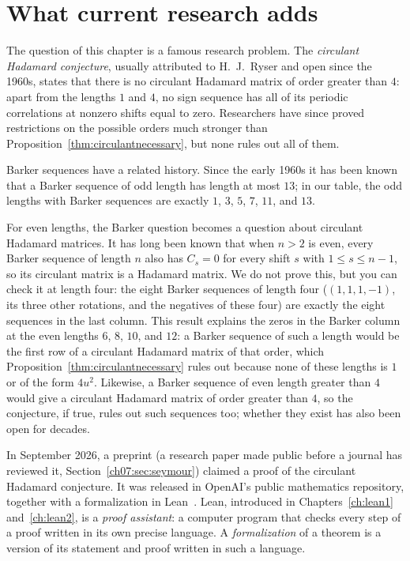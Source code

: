 \section{What current research adds}\label{ch14:sec:research}
The question of this chapter is a famous research problem. The \emph{circulant Hadamard conjecture}, usually attributed to H.~J.~Ryser and open since the 1960s, states that there is no circulant Hadamard matrix of order greater than $4$: apart from the lengths $1$ and $4$, no sign sequence has all of its periodic correlations at nonzero shifts equal to zero. Researchers have since proved restrictions on the possible orders much stronger than Proposition~\ref{thm:circulantnecessary}, but none rules out all of them.

Barker sequences have a related history. Since the early 1960s it has been known that a Barker sequence of odd length has length at most $13$; in our table, the odd lengths with Barker sequences are exactly $1$, $3$, $5$, $7$, $11$, and $13$.

For even lengths, the Barker question becomes a question about circulant Hadamard matrices. It has long been known that when $n>2$ is even, every Barker sequence of length $n$ also has $C_s=0$ for every shift $s$ with $1\le s\le n-1$, so its circulant matrix is a Hadamard matrix. We do not prove this, but you can check it at length four: the eight Barker sequences of length four ($(1,1,1,-1)$, its three other rotations, and the negatives of these four) are exactly the eight sequences in the last column. This result explains the zeros in the Barker column at the even lengths $6$, $8$, $10$, and $12$: a Barker sequence of such a length would be the first row of a circulant Hadamard matrix of that order, which Proposition~\ref{thm:circulantnecessary} rules out because none of these lengths is $1$ or of the form $4u^2$. Likewise, a Barker sequence of even length greater than $4$ would give a circulant Hadamard matrix of order greater than $4$, so the conjecture, if true, rules out such sequences too; whether they exist has also been open for decades.

In September 2026, a preprint (a research paper made public before a journal has reviewed it, Section~\ref{ch07:sec:seymour}) claimed a proof of the circulant Hadamard conjecture. It was released in OpenAI's public mathematics repository, together with a formalization in Lean~\cite{oai179}. Lean, introduced in Chapters~\ref{ch:lean1} and~\ref{ch:lean2}, is a \emph{proof assistant}: a computer program that checks every step of a proof written in its own precise language. A \emph{formalization} of a theorem is a version of its statement and proof written in such a language.

